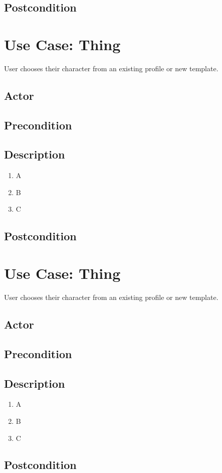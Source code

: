 \documentclass[11pt]{article}
\begin{document}
		\subsection{Postcondition}


    \section{Use Case: Thing}
	User chooses their character from an existing profile or new template.

		\subsection{Actor}

		\subsection{Precondition}
 
		\subsection{Description}
			\begin{enumerate}
			\item A
			\item B
			\item C
			\end{enumerate}

		\subsection{Postcondition}

    \section{Use Case: Thing}
	User chooses their character from an existing profile or new template.

		\subsection{Actor}

		\subsection{Precondition}
 
		\subsection{Description}
			\begin{enumerate}
			\item A
			\item B
			\item C
			\end{enumerate}

		\subsection{Postcondition}
\end{document}
